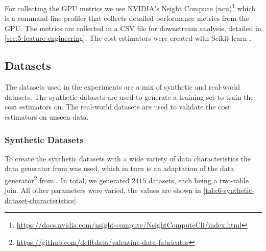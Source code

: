 For collecting the GPU metrics we use NVIDIA's Nsight Compute (ncu)\footnote{\url{https://docs.nvidia.com/nsight-compute/NsightComputeCli/index.html}} which is a command-line profiler that collects detailed performance metrics from the GPU. The metrics are collected in a CSV file for downstream analysis, detailed in \autoref{sec:5-feature-engineering}. The cost estimators were created with Scikit-learn \cite{scikit-learn}.

\subsection{Datasets}
\label{subsec:6-datasets}
The datasets used in the experiments are a mix of synthetic and real-world datasets. The synthetic datasets are used to generate a training set to train the cost estimators on. The real-world datasets are used to validate the cost estimators on unseen data.

\subsubsection{Synthetic Datasets}
To create the synthetic datasets with a wide variety of data characteristics the data generator from \cite{schijndel_cost_estimation} was used, which in turn is an adaptation of the data generator\footnote{\url{https://github.com/delftdata/valentine-data-fabricator}} from \cite{valentine-data-generator}. In total, we generated $2415$ datasets, each being a two-table join. All other parameters were varied, the values are shown in \autoref{tab:6-synthetic-dataset-characteristics}.

